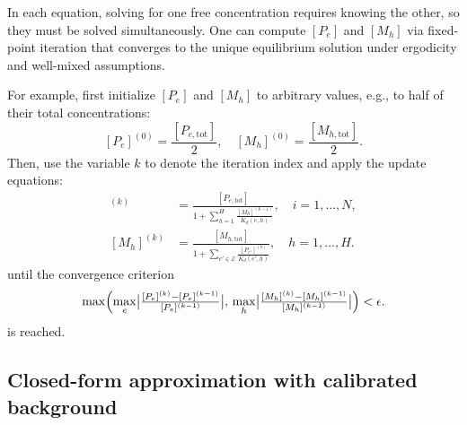 \documentclass[11pt]{article}
\begin{document}
In each equation, solving for one free concentration requires knowing the other, so they must be solved simultaneously. One can compute \([P_e]\) and \([M_h]\) via fixed-point iteration that converges to the unique equilibrium solution under ergodicity and well-mixed assumptions.

For example, first initialize $[P_e]$ and $[M_h]$ to arbitrary values, e.g., to half of their total concentrations:
\[
[P_e]^{(0)} = \frac{[P_{e,\mathrm{tot}}]}{2}, \quad
[M_h]^{(0)} = \frac{[M_{h,\mathrm{tot}}]}{2}.
\]
Then, use the variable $k$ to denote the iteration index and apply the update equations:
\begin{align}
[P_e]^{(k)} &= \frac{[P_{e,\mathrm{tot}}]}{1 + \sum_{h=1}^H \frac{[M_h]^{(k-1)}}{K_{d}(e,h)}}, 
\quad i=1,\dots,N,\\
[M_h]^{(k)} &= \frac{[M_{h,\mathrm{tot}}]}{1 + \sum_{e' \in \mathcal E} \frac{[P_{e'}]^{(k)}}{K_{d}(e',h)}}, 
\quad h=1,\dots,H.
\end{align}
until the convergence criterion
\[
\max\Bigl(\max_e\bigl|\tfrac{[P_e]^{(k)}-[P_e]^{(k-1)}}{[P_e]^{(k-1)}}\bigr|,\,
\max_h\bigl|\tfrac{[M_h]^{(k)}-[M_h]^{(k-1)}}{[M_h]^{(k-1)}}\bigr|\Bigr)
< \epsilon.
\]
is reached.

\newpage

\subsection{Closed-form approximation with calibrated background}
\end{document}
